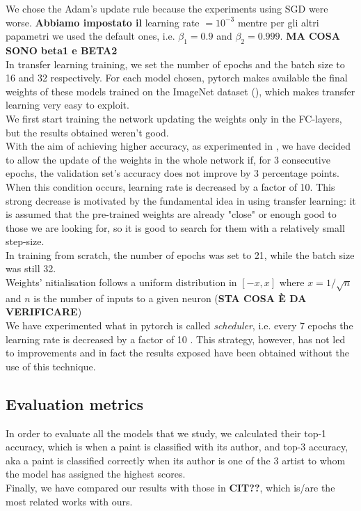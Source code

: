 \documentclass{article}
\begin{document}
We chose the Adam's update rule because the experiments using SGD were worse. \textbf{Abbiamo impostato il }learning rate $= 10^{-3}$ mentre per gli altri papametri we used the default ones, i.e. $\beta_{1}  = 0.9$ and $\beta_{2} = 0.999$.  \textbf{MA COSA SONO beta1 e BETA2}\\

In transfer learning training, we set the number of epochs and the batch size to 16 and 32 respectively.  For each model chosen, pytorch makes available the final weights of these models trained on the ImageNet dataset (\cite{imagenet}), which makes transfer learning very easy to exploit.\\
We first start training the network updating the weights only in the FC-layers, but the results obtained weren't good.\\
With the aim of achieving higher accuracy, as experimented in \cite{ArtistIdCNN406}, we have decided to allow the update of the weights in the whole network if, for 3 consecutive epochs, the validation set's accuracy does not improve by 3 percentage points. When this condition occurs, learning rate is decreased by a factor of 10. This strong decrease is motivated by the fundamental idea in using transfer learning: it is assumed that the pre-trained weights are already "close" or enough good to those we are looking for, so it is good to search for them with a relatively small step-size.
\\

In training from scratch, the number of epochs was set to 21, while the batch size was still 32.\\ 
Weights' nitialisation follows a uniform distribution in $[-x, x]$ where $x=1/\sqrt n$ and $n$ is the number of inputs to a given neuron (\textbf{STA COSA È DA VERIFICARE})\\
We have experimented what in pytorch is called \textit{scheduler}, i.e. every 7 epochs the learning rate is decreased by a factor of 10 . This strategy, however, has not led to improvements and in fact the results exposed have been obtained without the use of this technique.

\subsection{Evaluation metrics}
In order to evaluate all the models that we study, we calculated their top-1 accuracy, which is when a paint is classified with its author, and top-3 accuracy, aka a paint is classified correctly when its author is one of the 3 artist to whom the model has assigned the highest scores.\\
Finally, we have compared our results with those in \textbf{CIT??}, which is/are the most related works with ours. 
\end{document}
